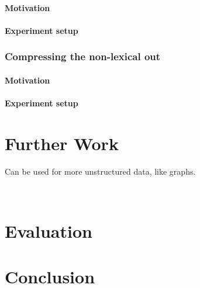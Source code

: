 \documentclass[a4paper,12pt,twoside,openright]{report}
\begin{document}
\subsubsection{Motivation}
\subsubsection{Experiment setup}

\subsection{Compressing the non-lexical out}
\subsubsection{Motivation}
\subsubsection{Experiment setup}

\chapter{Further Work}

Can be used for more unstructured data, like graphs.

\
\chapter{Evaluation}

\chapter{Conclusion}

\appendix
\singlespacing

 
 
\end{document}
